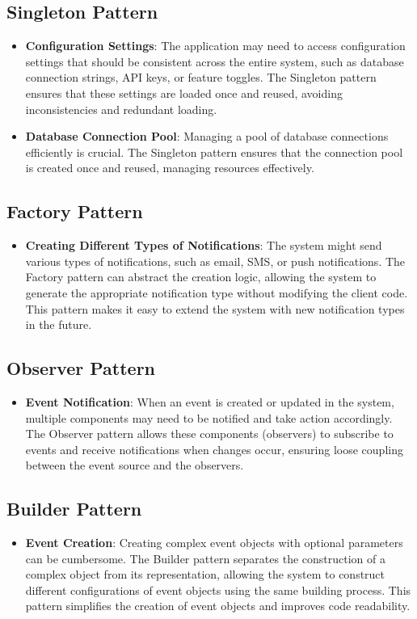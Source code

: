 \documentclass[a4paper,12pt]{article}
\begin{document}
\subsection*{Singleton Pattern}
\begin{itemize}[label=--]
    \item \textbf{Configuration Settings}: The application may need to access configuration settings that should 
    be consistent across the entire system, such as database connection strings, API keys, or feature toggles. 
    The Singleton pattern ensures that these settings are loaded once and reused, avoiding inconsistencies and redundant loading.
    \item \textbf{Database Connection Pool}: Managing a pool of database connections efficiently is crucial. 
    The Singleton pattern ensures that the connection pool is created once and reused, managing resources effectively.
\end{itemize}

\subsection*{Factory Pattern}
\begin{itemize}[label=--]
    \item \textbf{Creating Different Types of Notifications}: The system might send various types of notifications, 
    such as email, SMS, or push notifications. The Factory pattern can abstract the creation logic, allowing the 
    system to generate the appropriate notification type without modifying the client code. This pattern makes it 
    easy to extend the system with new notification types in the future.
\end{itemize}

\subsection*{Observer Pattern}
\begin{itemize}[label=--]
    \item \textbf{Event Notification}: When an event is created or updated in the system, multiple components may 
    need to be notified and take action accordingly. The Observer pattern allows these components (observers) to 
    subscribe to events and receive notifications when changes occur, ensuring loose coupling between the event 
    source and the observers.
\end{itemize}

\subsection*{Builder Pattern}
\begin{itemize}[label=--]
    \item \textbf{Event Creation}: Creating complex event objects with optional parameters can be cumbersome. 
    The Builder pattern separates the construction of a complex object from its representation, allowing the 
    system to construct different configurations of event objects using the same building process. This pattern 
    simplifies the creation of event objects and improves code readability.
\end{itemize}
\end{document}
